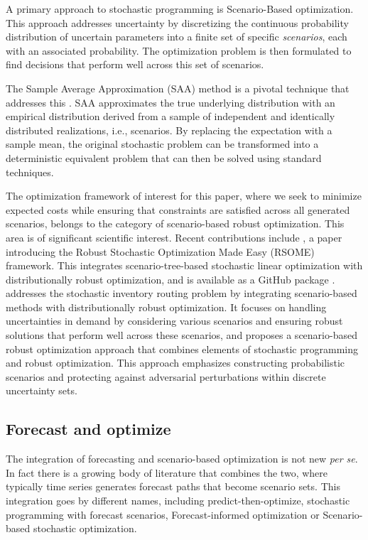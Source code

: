 \documentclass[ijoc,sglanonrev]{informs4}
\begin{document}
A primary approach to stochastic programming is Scenario-Based optimization. This approach addresses uncertainty by discretizing the continuous probability distribution of uncertain parameters into a finite set of specific {\it scenarios}, each with an associated probability. The optimization problem is then formulated to find decisions that perform well across this set of scenarios.

The Sample Average Approximation (SAA) method is a pivotal technique that addresses this \cite{SH98}. SAA approximates the true underlying distribution with an empirical distribution derived from a sample of independent and identically distributed realizations, i.e., scenarios. By replacing the expectation with a sample mean, the original stochastic problem can be transformed into a deterministic equivalent problem that can then be solved using standard techniques.

The optimization framework of interest for this paper, where we seek to minimize expected costs while ensuring that constraints are satisfied across all generated scenarios, belongs to the category of scenario-based robust optimization. This area is of significant scientific interest. Recent contributions include \cite{CSX20}, a paper introducing the Robust Stochastic Optimization Made Easy (RSOME) framework. This integrates scenario-tree-based stochastic linear optimization with distributionally robust optimization, and is available as a GitHub package \cite{CX23}. \cite{LCKZ23} addresses the stochastic inventory routing problem by integrating scenario-based methods with distributionally robust optimization. It focuses on handling uncertainties in demand by considering various scenarios and ensuring robust solutions that perform well across these scenarios, and \cite{WAJ23} proposes a scenario-based robust optimization approach that combines elements of stochastic programming and robust optimization. This approach emphasizes constructing probabilistic scenarios and protecting against adversarial perturbations within discrete uncertainty sets.

\subsection{Forecast and optimize}

The integration of forecasting and scenario-based optimization is not new {\it per se}. In fact there is a growing body of literature that combines the two, where typically time series generates forecast paths that become scenario sets.
This integration goes by different names, including predict-then-optimize, stochastic programming with forecast scenarios, Forecast-informed optimization or Scenario-based stochastic optimization.
\end{document}
